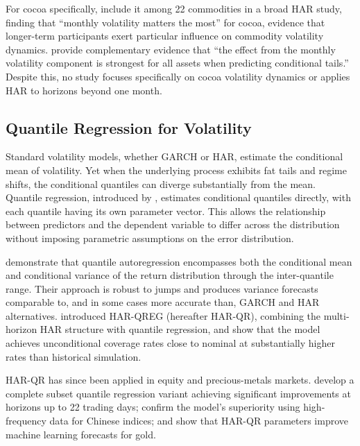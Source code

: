 For cocoa specifically,
\textcite{alfeusForecastingVolatilityCommodity2022} include it among
22 commodities in a broad HAR study, finding that ``monthly volatility
matters the most'' for cocoa, evidence that longer-term participants
exert particular influence on commodity volatility dynamics.
\textcite{haugomParsimoniousQuantileRegression2016} provide
complementary evidence that ``the effect from the monthly volatility
component is strongest for all assets when predicting conditional
tails.'' Despite this, no study focuses specifically on cocoa
volatility dynamics or applies HAR to horizons beyond one month.

\subsection{Quantile Regression for Volatility}
\label{sec:lit-qr}

Standard volatility models, whether GARCH or HAR, estimate the
conditional mean of volatility. Yet when the underlying process exhibits
fat tails and regime shifts, the conditional quantiles can diverge
substantially from the mean. Quantile regression, introduced by
\textcite{koenker1978regression}, estimates conditional quantiles
directly, with each quantile having its own parameter vector. This
allows the relationship between predictors and the dependent variable
to differ across the distribution without imposing parametric
assumptions on the error distribution.

\textcite{baurQuantileRegressionApproach2019} demonstrate that quantile
autoregression encompasses both the conditional mean and conditional
variance of the return distribution through the inter-quantile range.
Their approach is robust to jumps and produces variance forecasts
comparable to, and in some cases more accurate than, GARCH and HAR
alternatives.
\textcite{haugomParsimoniousQuantileRegression2016} introduced HAR-QREG
(hereafter HAR-QR), combining the multi-horizon HAR structure with quantile
regression, and show that the model achieves unconditional coverage rates
close to nominal at substantially higher rates than historical simulation.

HAR-QR has since been applied in equity and precious-metals markets.
\textcite{lyocsaImprovingStockMarket2021} develop a complete subset
quantile regression variant achieving significant improvements at
horizons up to 22 trading days;
\textcite{huangHighfrequencyApproachVaR2022} confirm the model's
superiority using high-frequency data for Chinese indices; and
\textcite{songGoldFuturesVolatility2025} show that HAR-QR parameters
improve machine learning forecasts for gold.

